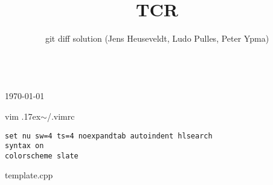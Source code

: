 \documentclass{article}
\title{TCR}
\author{git diff solution (Jens Heuseveldt, Ludo Pulles, Peter Ypma)}
\begin{document}
\begin{center}
	\makeatletter
	\textbf{\@title} \\
	\today \\
	\emph{\@author}
	\makeatother
\end{center}


\begin{center}
vim {\raise.17ex\hbox{$\scriptstyle\sim$}}/.vimrc
\end{center}

\begin{lstlisting}[]
set nu sw=4 ts=4 noexpandtab autoindent hlsearch
syntax on
colorscheme slate
\end{lstlisting}

\begin{center}
template.cpp
\end{center}
\end{document}
